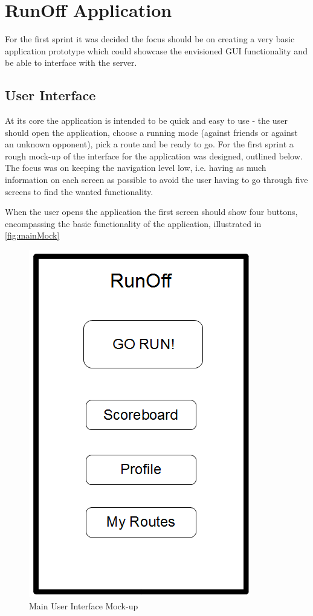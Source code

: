 \section{RunOff Application}
For the first sprint it was decided the focus should be on creating a very basic application prototype which could showcase the envisioned \ac{GUI} functionality and be able to interface with the server. 

\subsection{User Interface}
At its core the application is intended to be quick and easy to use - the user should open the application, choose a running mode (against friends or against an unknown opponent), pick a route and be ready to go. For the first sprint a rough mock-up of the interface for the application was designed, outlined below. The focus was on keeping the navigation level low, i.e. having as much information on each screen as possible to avoid the user having to go through five screens to find the wanted functionality.
\vspace{10pt}

When the user opens the application the first screen should show four buttons, encompassing the basic functionality of the application, illustrated in \autoref{fig:mainMock}

\begin{figure}[ht]
\begin{center}
 \includegraphics[scale=0.4]{img/mainMockV1.png}
 \caption{Main User Interface Mock-up}
 \label{fig:mainMock}
\end{center}
\end{figure}


